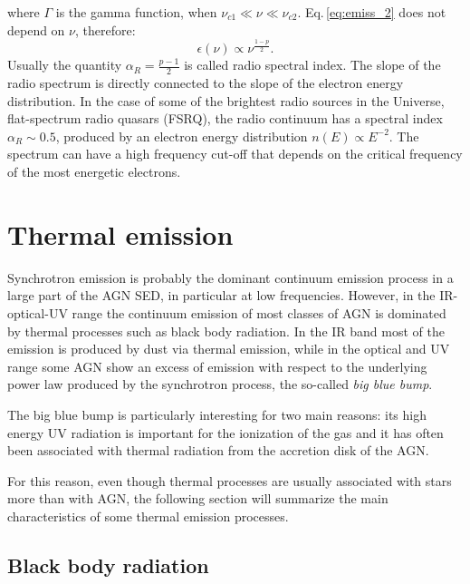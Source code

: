 \documentclass[../main.tex]{subfiles}
\begin{document}
where $\Gamma$ is the gamma function, when $\nu_{c1}\ll\nu\ll\nu_{c2}$.
Eq.\,\ref{eq:emiss_2} does not depend on $\nu$, therefore:
\begin{equation}
    \label{eq:emiss_3}
    \epsilon(\nu) \propto \nu^{\frac{1-p}{2}}.
\end{equation}
Usually the quantity $\alpha_R = \frac{p-1}{2}$ is called radio spectral index.
The slope of the radio spectrum is directly connected to the slope of the electron energy distribution.
In the case of some of the brightest radio sources in the Universe, flat-spectrum radio quasars (FSRQ), the radio continuum has a spectral index $\alpha_R \sim 0.5$, produced by an electron energy distribution $n(E)\propto E^{-2}$.
The spectrum can have a high frequency cut-off that depends on the critical frequency of the most energetic electrons.

\section{Thermal emission}
\label{sec:thermal_emission}

Synchrotron emission is probably the dominant continuum emission process in a large part of the AGN SED, in particular at low frequencies.
However, in the IR-optical-UV range the continuum emission of most classes of AGN is dominated by thermal processes such as black body radiation.
In the IR band most of the emission is produced by dust via thermal emission, while in the optical and UV range some AGN show an excess of emission with respect to the underlying power law produced by the synchrotron process, the so-called \emph{big blue bump}.

The big blue bump is particularly interesting for two main reasons: its high energy UV radiation is important for the ionization of the gas and it has often been associated with thermal radiation from the accretion disk of the AGN.

For this reason, even though thermal processes are usually associated with stars more than with AGN, the following section will summarize the main characteristics of some thermal emission processes.

\subsection{Black body radiation}
\end{document}
